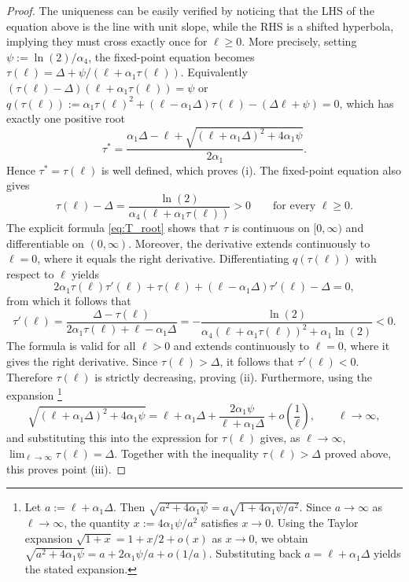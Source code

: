 \documentclass{article}
\begin{document}
\begin{proof}
    The uniqueness can be easily verified by noticing that the LHS of the equation above is the line with unit slope, while the RHS is a shifted hyperbola, implying they must cross exactly once for $\ell\ge0$. More precisely,
    setting $\psi := \ln(2)/\alpha_4$, 
    the fixed-point equation becomes $\tau(\ell) = \Delta + \psi/(\ell + \alpha_1 \tau(\ell))$. Equivalently $(\tau(\ell)-\Delta)(\ell+\alpha_1\tau(\ell))=\psi$ or
    $q(\tau(\ell)):=\alpha_1\tau(\ell)^2+(\ell-\alpha_1\Delta)\tau(\ell)-(\Delta\ell+\psi)=0$,
    which has exactly one positive root
    \begin{equation}\label{eq:T_root}
        \tau^*=\frac{\alpha_1\Delta-\ell+\sqrt{(\ell+\alpha_1\Delta)^2+4\alpha_1\psi}}{2\alpha_1}.
     \end{equation}
    Hence $\tau^* = \tau(\ell)$ is well defined, which proves (i). The fixed-point equation also gives
    \begin{equation*}
        \tau(\ell)-\Delta = \frac{\ln(2)}{\alpha_4(\ell+\alpha_1\tau(\ell))} > 0
        \qquad\text{for every } \ell\ge0.
    \end{equation*}
    The explicit formula \eqref{eq:T_root} shows that $\tau$ is continuous on $[0,\infty)$ and differentiable on $(0,\infty)$. Moreover, the derivative extends continuously to $\ell=0$, where it equals the right derivative.
    Differentiating $q(\tau(\ell))$ with respect to $\ell$ yields
    \begin{equation*}
        2\alpha_1\tau(\ell)\tau'(\ell)+\tau(\ell)+(\ell-\alpha_1\Delta)\tau'(\ell)-\Delta=0,
    \end{equation*}
    from which it follows that
    \begin{equation*}
        \tau'(\ell)=\frac{\Delta-\tau(\ell)}{2\alpha_1\tau(\ell)+\ell-\alpha_1\Delta} 
        = -\frac{\ln(2)}{\alpha_4\left(\ell+\alpha_1\tau(\ell)\right)^2+\alpha_1\ln(2)}<0.
    \end{equation*}
    The formula is valid for all $\ell>0$ and extends continuously to $\ell=0$, where it gives the right derivative.
    Since $\tau(\ell)>\Delta$, it follows that $\tau'(\ell)<0$. Therefore $\tau(\ell)$ is strictly decreasing, proving (ii). Furthermore, using the expansion
    \footnote{Let $a:=\ell+\alpha_1\Delta$. Then $\sqrt{a^2+4\alpha_1\psi}=a\sqrt{1+4\alpha_1\psi/a^2}.$ Since $a\to\infty$ as $\ell\to\infty$, the quantity $x:=4\alpha_1\psi/a^2$ satisfies $x\to0$. Using the Taylor expansion $\sqrt{1+x}=1+x/2+o(x)$ as $x\to0$, we obtain
    $\sqrt{a^2+4\alpha_1\psi}=a+2\alpha_1\psi/a+o\!\left(1/a\right).$
    Substituting back $a=\ell+\alpha_1\Delta$ yields the stated expansion.}
    \begin{equation*}
        \sqrt{(\ell+\alpha_1\Delta)^2+4\alpha_1\psi}
        =\ell+\alpha_1\Delta+\frac{2\alpha_1\psi}{\ell+\alpha_1\Delta}
        +o\!\left(\frac1\ell\right), \qquad \ell\to\infty,
    \end{equation*}
    and substituting this into the expression for $\tau(\ell)$ gives, as $\ell\to\infty$, $\lim_{\ell\to\infty}\tau(\ell)=\Delta$.
    Together with the inequality $\tau(\ell)>\Delta$ proved above, this proves point (iii).


\end{proof}
\end{document}
